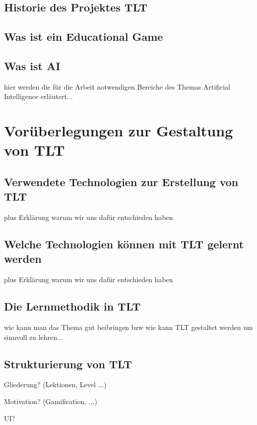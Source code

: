 \documentclass[a4paper]{article}
\begin{document}
\subsection{Historie des Projektes TLT}

\subsection{Was ist ein Educational Game}

\subsection{Was ist AI}

hier werden die für die Arbeit notwendigen Bereiche des Themas Artificial Intelligence erläutert...

\section{Vorüberlegungen zur Gestaltung von TLT}

\subsection{Verwendete Technologien zur Erstellung von TLT}

plus Erklärung warum wir uns dafür entschieden haben

\subsection{Welche Technologien können mit TLT gelernt werden}

plus Erklärung warum wir uns dafür entschieden haben

\subsection{Die Lernmethodik in TLT}

wie kann man das Thema gut beibringen bzw wie kann TLT gestaltet werden um sinnvoll zu lehren...

\subsection{Strukturierung von TLT}

Gliederung? (Lektionen, Level ...)

Motivation? (Gamification, ...)

UI?
\end{document}
